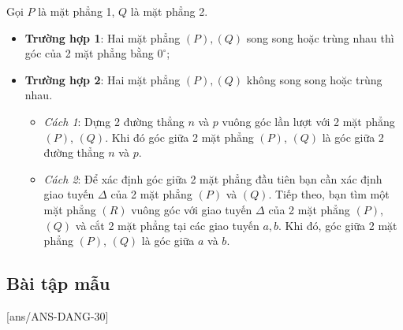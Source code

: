 \begin{khung}
Gọi $ P $ là mặt phẳng 1, $ Q $ là mặt phẳng 2.
	\begin{itemize}
		\item \textbf{Trường hợp 1}: Hai mặt phẳng $ (P), (Q) $ song song hoặc trùng nhau thì góc của 2 mặt phẳng bằng $ 0^\circ $;
		\item \textbf{Trường hợp 2}: Hai mặt phẳng $ (P), (Q) $ không song song hoặc trùng nhau.
	\begin{itemize}
		\item \textit{Cách 1}: Dựng 2 đường thẳng $ n $ và $ p $ vuông góc lần lượt với 2 mặt phẳng $ (P) $, $ (Q) $. Khi đó góc giữa 2 mặt phẳng $ (P) $, $ (Q) $ là góc giữa 2 đường thẳng $ n $ và $ p $.
		\item \textit{Cách 2}: Để xác định góc giữa 2 mặt phẳng đầu tiên bạn cần xác định giao tuyến $ \Delta $ của 2 mặt phẳng $ (P) $ và $ (Q) $. Tiếp theo, bạn tìm một mặt phẳng $ (R) $ vuông góc với giao tuyến $ \Delta $ của 2 mặt phẳng $ (P) $, $ (Q) $ và cắt 2 mặt phẳng tại các giao tuyến $ a, b $.
		Khi đó, góc giữa 2 mặt phẳng $ (P) $, $ (Q) $ là góc giữa $ a $ và $ b $.
		\end{itemize}
	\end{itemize}
\end{khung}
\subsection{Bài tập mẫu}
[ans/ANS-DANG-30]
\begin{khung}
	\begin{vd}%
	\end{vd}
\end{khung}
